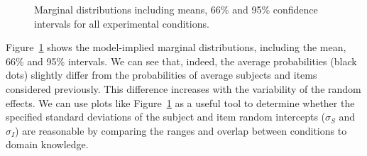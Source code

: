 \documentclass[
  man,
  floatsintext,
  longtable,
  a4paper,
  nolmodern,
  notxfonts,
  notimes,
  colorlinks=true,linkcolor=blue,citecolor=blue,urlcolor=blue]{apa7}
\begin{document}
\begin{figure}[H]

\caption{\label{fig-margdist1}Marginal distributions including means,
66\% and 95\% confidence intervals for all experimental conditions.}


\end{figure}%

Figure~\ref{fig-margdist1} shows the model-implied marginal
distributions, including the mean, 66\% and 95\% intervals. We can see
that, indeed, the average probabilities (black dots) slightly differ
from the probabilities of average subjects and items considered
previously. This difference increases with the variability of the random
effects. We can use plots like Figure~\ref{fig-margdist1} as a useful
tool to determine whether the specified standard deviations of the
subject and item random intercepts (\(\sigma_S\) and \(\sigma_I\)) are
reasonable by comparing the ranges and overlap between conditions to
domain knowledge.
\end{document}
